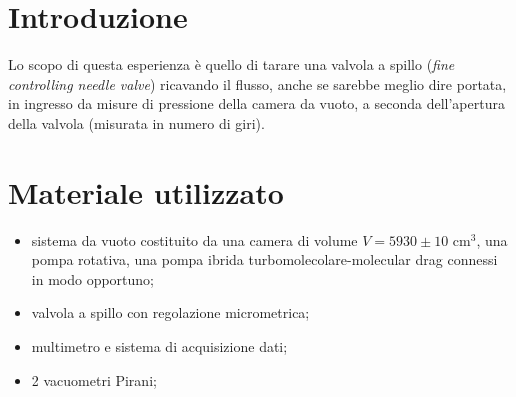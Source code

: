 \section{Introduzione}

Lo scopo di questa esperienza è quello di tarare una valvola a spillo (\textit{fine controlling needle valve}) ricavando il flusso, anche se sarebbe meglio dire portata, in ingresso da misure di pressione della camera da vuoto, a seconda dell'apertura della valvola (misurata in numero di giri).

\section{Materiale utilizzato}

\begin{itemize}
	\item{sistema da vuoto costituito da una camera di volume $V = 5930 \pm 10$ \si{\centi\metre}$^3$, una pompa rotativa, una pompa ibrida turbomolecolare-molecular drag connessi in modo opportuno;}
	\item{valvola a spillo con regolazione micrometrica;}
	\item{multimetro e sistema di acquisizione dati;}
	\item{2 vacuometri Pirani;}
\end{itemize}

